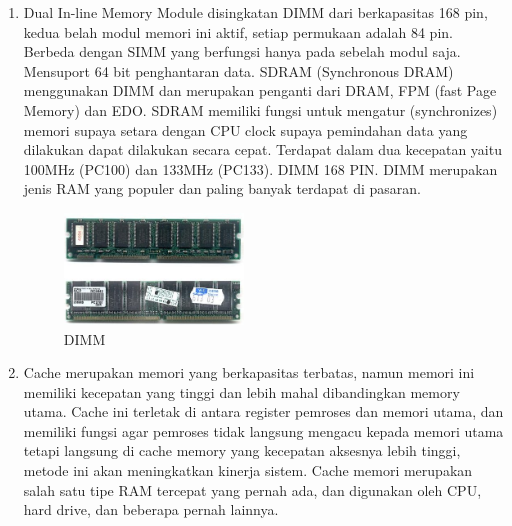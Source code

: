 \begin{enumerate}
\item Dual In-line Memory Module disingkatan DIMM dari  berkapasitas 168 pin, kedua belah modul memori ini aktif, setiap permukaan adalah 84 pin. Berbeda dengan SIMM yang berfungsi hanya pada sebelah modul saja. Mensuport 64 bit penghantaran data. SDRAM
(Synchronous DRAM) menggunakan DIMM dan merupakan penganti dari DRAM, FPM (fast Page Memory) dan EDO. SDRAM memiliki fungsi untuk mengatur (synchronizes) memori supaya setara dengan CPU clock supaya pemindahan data yang dilakukan dapat dilakukan secara cepat. Terdapat dalam dua kecepatan yaitu 100MHz (PC100) dan 133MHz (PC133). DIMM 168 PIN. DIMM merupakan jenis RAM yang populer dan paling banyak terdapat di pasaran.
\begin{figure}[htbp]
\centering
\includegraphics[width=0.45\textwidth]{figures/image/dimm.jpg}
\caption{DIMM}
\label{labelgambar3}
\end{figure}

\item Cache merupakan memori yang berkapasitas terbatas, namun memori ini memiliki kecepatan  yang tinggi dan lebih mahal dibandingkan memory utama. Cache ini terletak di antara register pemroses dan memori utama, dan memiliki fungsi agar pemroses tidak langsung mengacu kepada memori utama tetapi langsung di cache memory yang kecepatan aksesnya lebih tinggi, metode ini akan meningkatkan kinerja sistem. Cache memori merupakan salah satu tipe RAM tercepat yang pernah ada, dan digunakan oleh CPU, hard drive, dan beberapa pernah lainnya.


\end{enumerate}
